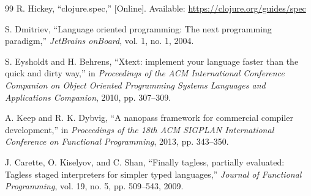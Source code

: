 \documentclass[conference]{IEEEtran}
\begin{document}
\begin{thebibliography}{99}
R. Hickey, ``clojure.spec,''
[Online]. Available: \url{https://clojure.org/guides/spec}

S. Dmitriev, ``Language oriented programming: The next programming paradigm,''
\emph{JetBrains onBoard}, vol. 1, no. 1, 2004.

S. Eysholdt and H. Behrens, ``Xtext: implement your language faster than the quick and dirty way,''
in \emph{Proceedings of the ACM International Conference Companion on Object Oriented Programming Systems Languages and Applications Companion}, 2010, pp. 307--309.

A. Keep and R. K. Dybvig, ``A nanopass framework for commercial compiler development,''
in \emph{Proceedings of the 18th ACM SIGPLAN International Conference on Functional Programming}, 2013, pp. 343--350.

J. Carette, O. Kiselyov, and C. Shan, ``Finally tagless, partially evaluated: Tagless staged interpreters for simpler typed languages,''
\emph{Journal of Functional Programming}, vol. 19, no. 5, pp. 509--543, 2009.

\end{thebibliography}
\end{document}
